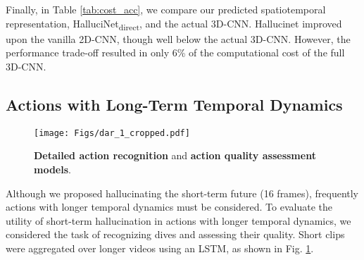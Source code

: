 \documentclass[10pt,twocolumn,letterpaper]{article}
\begin{document}
Finally, in Table \ref{tab:cost_acc}, we compare our predicted spatiotemporal representation, HalluciNet\textsubscript{direct}, and the actual 3D-CNN. Hallucinet improved upon the vanilla 2D-CNN, though well below the actual 3D-CNN.  However, the performance trade-off resulted in only 6\% of the computational cost of the full 3D-CNN.

\subsection{Actions with Long-Term Temporal Dynamics}
\label{exp_longterm}
\begin{figure}
\centering
\texttt{[image: Figs/dar\_1\_cropped.pdf]}
\caption{\textbf{Detailed action recognition} and \textbf{action quality assessment models}.}
\label{fig_dar}
\end{figure}
Although we proposed hallucinating the short-term future (16 frames), frequently actions with longer temporal dynamics must be considered.  To evaluate the utility of short-term hallucination in actions with longer temporal dynamics, we considered the task of recognizing dives and assessing their quality. Short clips were aggregated over longer videos using an LSTM, as shown in Fig. \ref{fig_dar}.
\end{document}
